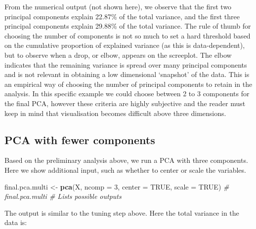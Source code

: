 \documentclass[]{book}
\newenvironment{Shaded}{\begin{snugshade}}{\end{snugshade}}
\newcommand{\CommentTok}[1]{\textcolor[rgb]{0.56,0.35,0.01}{\textit{#1}}}
\newcommand{\DataTypeTok}[1]{\textcolor[rgb]{0.13,0.29,0.53}{#1}}
\newcommand{\DecValTok}[1]{\textcolor[rgb]{0.00,0.00,0.81}{#1}}
\newcommand{\KeywordTok}[1]{\textcolor[rgb]{0.13,0.29,0.53}{\textbf{#1}}}
\newcommand{\NormalTok}[1]{#1}
\newcommand{\OperatorTok}[1]{\textcolor[rgb]{0.81,0.36,0.00}{\textbf{#1}}}
\newcommand{\OtherTok}[1]{\textcolor[rgb]{0.56,0.35,0.01}{#1}}
\newcommand{\StringTok}[1]{\textcolor[rgb]{0.31,0.60,0.02}{#1}}
\begin{document}
\begin{Shaded}
\end{Shaded}



From the numerical output (not shown here), we observe that the first two principal components explain 22.87\% of the total variance, and the first three principal components explain 29.88\% of the total variance. The rule of thumb for choosing the number of components is not so much to set a hard threshold based on the cumulative proportion of explained variance (as this is data-dependent), but to observe when a drop, or elbow, appears on the screeplot. The elbow indicates that the remaining variance is spread over many principal components and is not relevant in obtaining a low dimensional `snapshot' of the data. This is an empirical way of choosing the number of principal components to retain in the analysis. In this specific example we could choose between 2 to 3 components for the final PCA, however these criteria are highly subjective and the reader must keep in mind that visualisation becomes difficult above three dimensions.

\hypertarget{pca-with-fewer-components}{%
\subsection{PCA with fewer components}\label{pca-with-fewer-components}}

Based on the preliminary analysis above, we run a PCA with three components. Here we show additional input, such as whether to center or scale the variables.

\begin{Shaded}
\begin{Highlighting}[]
\NormalTok{final.pca.multi <-}\StringTok{ }\KeywordTok{pca}\NormalTok{(X, }\DataTypeTok{ncomp =} \DecValTok{3}\NormalTok{, }\DataTypeTok{center =} \OtherTok{TRUE}\NormalTok{, }\DataTypeTok{scale =} \OtherTok{TRUE}\NormalTok{)}
\CommentTok{# final.pca.multi  # Lists possible outputs}
\end{Highlighting}
\end{Shaded}

The output is similar to the tuning step above. Here the total variance in the data is:

\begin{Shaded}
\end{Shaded}
\end{document}
